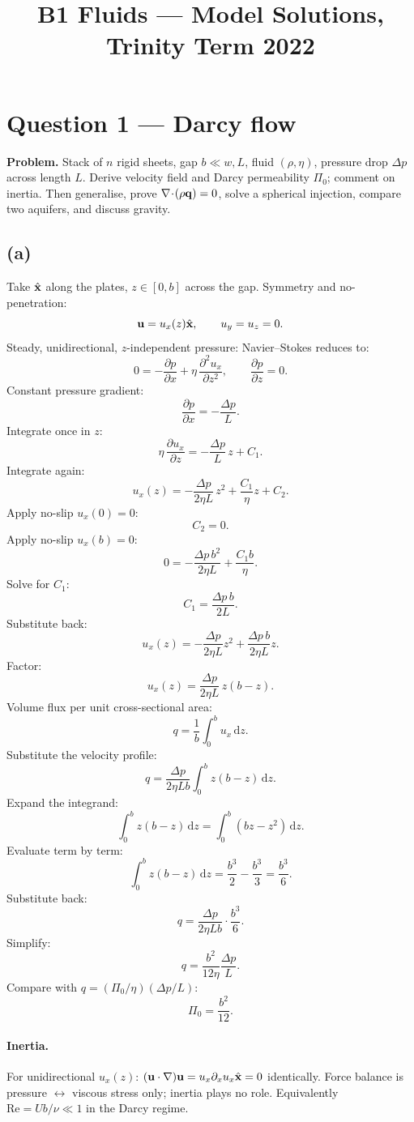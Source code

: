\documentclass[11pt]{article}
\title{B1 Fluids --- Model Solutions, Trinity Term 2022}
\author{}
\date{}
\newcommand{\de}{\mathrm{d}}
\newcommand{\pd}[2]{\frac{\partial #1}{\partial #2}}
\newcommand{\pdd}[2]{\frac{\partial^{2} #1}{\partial #2^{2}}}
\begin{document}
\maketitle

\section*{Question 1 --- Darcy flow}

\textbf{Problem.} Stack of $n$ rigid sheets, gap $b\ll w,L$, fluid $(\rho,\eta)$, pressure drop $\Delta p$ across length $L$. Derive velocity field and Darcy permeability $\Pi_0$; comment on inertia. Then generalise, prove $\nabla\!\cdot\!(\rho\vb q)=0$, solve a spherical injection, compare two aquifers, and discuss gravity.

\subsection*{(a)}

Take $\hat{\vb x}$ along the plates, $z\in[0,b]$ across the gap. Symmetry and no-penetration:
\[ \vb u = u_x(z)\hat{\vb x}, \qquad u_y=u_z=0. \]
Steady, unidirectional, $z$-independent pressure: Navier--Stokes reduces to:
\[ 0 = -\pd{p}{x} + \eta\,\pdd{u_x}{z}, \qquad \pd{p}{z}=0. \]
Constant pressure gradient:
\[ \pd{p}{x} = -\frac{\Delta p}{L}. \]
Integrate once in $z$:
\[ \eta\,\pd{u_x}{z} = -\frac{\Delta p}{L}\,z + C_1. \]
Integrate again:
\[ u_x(z) = -\frac{\Delta p}{2\eta L}\,z^2 + \frac{C_1}{\eta}z + C_2. \]
Apply no-slip $u_x(0)=0$:
\[ C_2 = 0. \]
Apply no-slip $u_x(b)=0$:
\[ 0 = -\frac{\Delta p\,b^2}{2\eta L} + \frac{C_1 b}{\eta}. \]
Solve for $C_1$:
\[ C_1 = \frac{\Delta p\,b}{2L}. \]
Substitute back:
\[ u_x(z) = -\frac{\Delta p}{2\eta L}z^2 + \frac{\Delta p\,b}{2\eta L}z. \]
Factor:
\[ u_x(z) = \frac{\Delta p}{2\eta L}\,z(b-z). \]
Volume flux per unit cross-sectional area:
\[ q = \frac{1}{b}\int_0^b u_x\,\de z. \]
Substitute the velocity profile:
\[ q = \frac{\Delta p}{2\eta L b}\int_0^b z(b-z)\,\de z. \]
Expand the integrand:
\[ \int_0^b z(b-z)\,\de z = \int_0^b (bz - z^2)\,\de z. \]
Evaluate term by term:
\[ \int_0^b z(b-z)\,\de z = \frac{b^3}{2} - \frac{b^3}{3} = \frac{b^3}{6}. \]
Substitute back:
\[ q = \frac{\Delta p}{2\eta L b}\cdot\frac{b^3}{6}. \]
Simplify:
\[ q = \frac{b^2}{12\eta}\frac{\Delta p}{L}. \]
Compare with $q=(\Pi_0/\eta)(\Delta p/L)$:
\[ \boxed{\;\Pi_0 = \frac{b^2}{12}.\;} \]

\paragraph{Inertia.} For unidirectional $u_x(z)$: $(\vb u\cdot\nabla)\vb u = u_x\partial_x u_x\hat{\vb x}=0$ identically. Force balance is pressure $\leftrightarrow$ viscous stress only; inertia plays no role. Equivalently $\mathrm{Re}=Ub/\nu\ll 1$ in the Darcy regime.
\end{document}
